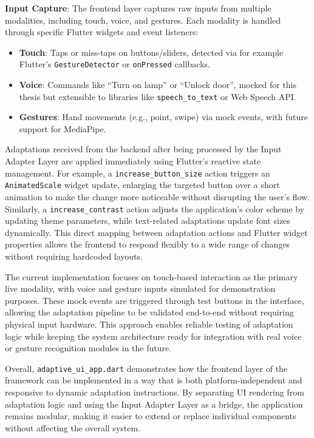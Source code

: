 \documentclass[openany]{book}
\begin{document}
\textbf{Input Capture}: The frontend layer captures raw inputs from multiple modalities, including touch, voice, and gestures. Each modality is handled through specific Flutter widgets and event listeners:
\begin{itemize}
    \item \textbf{Touch}: Taps or miss-taps on buttons/sliders, detected via for example Flutter’s \verb|GestureDetector| or \verb|onPressed| callbacks.
    \item \textbf{Voice}: Commands like “Turn on lamp” or “Unlock door”, mocked for this thesis but extensible to libraries like \verb|speech_to_text| or Web Speech API.
    \item \textbf{Gestures}: Hand movements (e.g., point, swipe) via mock events, with future support for MediaPipe.
\end{itemize}

Adaptations received from the backend after being processed by the Input Adapter Layer are applied immediately using Flutter’s reactive state management. For example, a \texttt{increase\_button\_size} action triggers an \texttt{AnimatedScale} widget update, enlarging the targeted button over a short animation to make the change more noticeable without disrupting the user’s flow. Similarly, a \texttt{increase\_contrast} action adjusts the application’s color scheme by updating theme parameters, while text-related adaptations update font sizes dynamically. This direct mapping between adaptation actions and Flutter widget properties allows the frontend to respond flexibly to a wide range of changes without requiring hardcoded layouts.

The current implementation focuses on touch-based interaction as the primary live modality, with voice and gesture inputs simulated for demonstration purposes. These mock events are triggered through test buttons in the interface, allowing the adaptation pipeline to be validated end-to-end without requiring physical input hardware. This approach enables reliable testing of adaptation logic while keeping the system architecture ready for integration with real voice or gesture recognition modules in the future.

Overall, \texttt{adaptive\_ui\_app.dart} demonstrates how the frontend layer of the framework can be implemented in a way that is both platform-independent and responsive to dynamic adaptation instructions. By separating UI rendering from adaptation logic and using the Input Adapter Layer as a bridge, the application remains modular, making it easier to extend or replace individual components without affecting the overall system.
\end{document}
